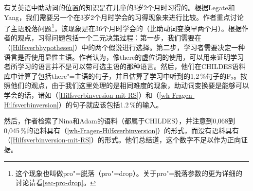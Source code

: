 \noindent
有关英语中助动词的位置的知识是在儿童的3岁2个月时习得的。根据Legate和Yang，我们需要另一个在3岁2个月时学会的习得现象来进行比较。作者重点讨论了主语脱落问题\footnote{%
这个现象也叫做pro"=脱落（pro"=drop）。关于pro"=脱落参数的更为详细的讨论请看\ref{sec-pro-drop}。
}，该现象是在36个月时学会的（比助动词变换早两个月）。根据作者的观点，习得问题包括一个二元决策过程：第一步，我们需要在（\ref{Hilfsverbhypothesen}）中的两个假说进行选择。第二步，学习者需要决定一种语言是否使用显性主语。作者认为，像there的虚位词的使用，可以用来证明学习者所学习的语言并不是可以带可选主语的那种语言。然后，他们在CHILDES语料库中计算了包括there"=主语的句子，并且估算了学习中听到的1,2\,\%句子的F$_2$。按照他们的观点，由于我们这里处理的是相同难度的现象，助动词变换要是能够可以学会的话，诸如（\ref{Hilfsverbinversion-mit-RS}）和（\ref{wh-Fragen-Hilfsverbinversion}）的句子就应该包括1.2\,\%的输入。

然后，作者检索了Nina和Adam的语料（都属于CHILDES），并注意到0,068到0,045\,\%的语料具有（\ref{wh-Fragen-Hilfsverbinversion}）的形式，而没有语料具有（\ref{Hilfsverbinversion-mit-RS}）的形式。他们总结道，这个数字不足以作为正向证据。

